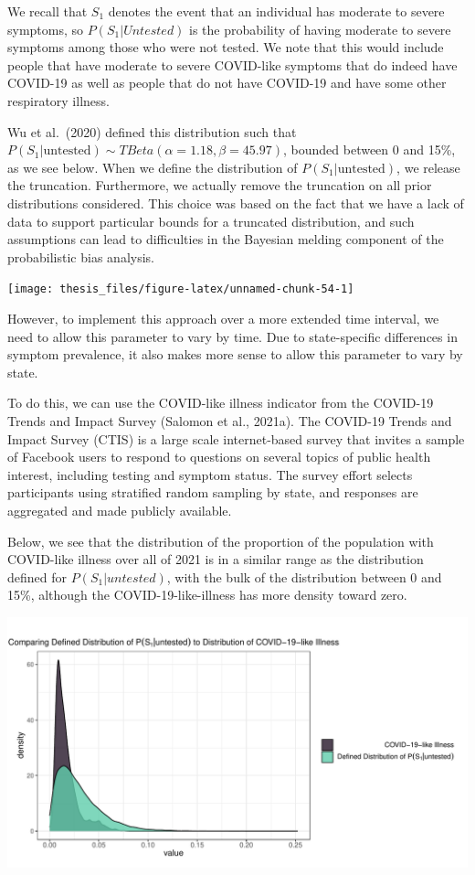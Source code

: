 \documentclass[12pt,twoside]{smiththesis}
\begin{document}
We recall that \(S_1\) denotes the event that an individual has moderate to severe symptoms, so
\(P(S_1|Untested)\) is the probability of having moderate to severe symptoms among those who were not tested. We note that this would include people that have moderate to severe COVID-like symptoms that do indeed have COVID-19 as well as people that do not have COVID-19 and have some other respiratory illness.

Wu et al.~(2020) defined this distribution such that \(P(S_1|\text{untested}) \sim TBeta(\alpha = 1.18, \beta = 45.97)\), bounded between 0 and 15\%, as we see below. When we define the distribution of \(P(S_1|\text{untested})\), we release the truncation. Furthermore, we actually remove the truncation on all prior distributions considered. This choice was based on the fact that we have a lack of data to support particular bounds for a truncated distribution, and such assumptions can lead to difficulties in the Bayesian melding component of the probabilistic bias analysis.
\begin{center}\texttt{[image: thesis\_files/figure-latex/unnamed-chunk-54-1]} \end{center}

However, to implement this approach over a more extended time interval, we need to allow this parameter to vary by time. Due to state-specific differences in symptom prevalence, it also makes more sense to allow this parameter to vary by state.

To do this, we can use the COVID-like illness indicator from the COVID-19 Trends and Impact Survey (Salomon et al., 2021a). The COVID-19 Trends and Impact Survey (CTIS) is a large scale internet-based survey that invites a sample of Facebook users to respond to questions on several topics of public health interest, including testing and symptom status. The survey effort selects participants using stratified random sampling by state, and responses are aggregated and made publicly available.

Below, we see that the distribution of the proportion of the population with COVID-like illness over all of 2021 is in a similar range as the distribution defined for \(P(S_1|untested)\), with the bulk of the distribution between 0 and 15\%, although the COVID-19-like-illness has more density toward zero.
\begin{center}\includegraphics[width=0.8\linewidth]{figure/emp_p_s_untested} \end{center}
\end{document}
